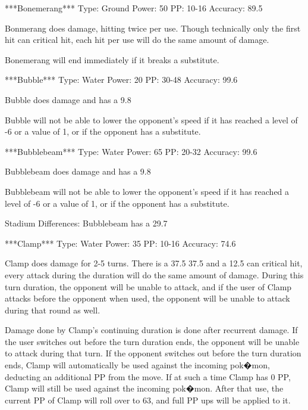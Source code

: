 \documentclass[reprint, aps, prl, paper=A4]{revtex4-1}
\begin{document}
***Bonemerang***
Type: Ground
Power: 50
PP: 10-16
Accuracy: 89.5%

Bonmerang does damage, hitting twice per use. Though technically only the first hit can
critical hit, each hit per use will do the same amount of damage.

Bonemerang will end immediately if it breaks a substitute.


***Bubble***
Type: Water
Power: 20
PP: 30-48
Accuracy: 99.6%

Bubble does damage and has a 9.8%

Bubble will not be able to lower the opponent's speed if it has reached a level of -6 or a
value of 1, or if the opponent has a substitute.


***Bubblebeam***
Type: Water
Power: 65
PP: 20-32
Accuracy: 99.6%

Bubblebeam does damage and has a 9.8%

Bubblebeam will not be able to lower the opponent's speed if it has reached a level of -6 or a
value of 1, or if the opponent has a substitute.

Stadium Differences:
Bubblebeam has a 29.7%


***Clamp***
Type: Water
Power: 35
PP: 10-16
Accuracy: 74.6%

Clamp does damage for 2-5 turns. There is a 37.5%
37.5%
and a 12.5%
can critical hit, every attack during the duration will do the same amount of damage. During
this turn duration, the opponent will be unable to attack, and if the user of Clamp attacks
before the opponent when used, the opponent will be unable to attack during that round as well.

Damage done by Clamp's continuing duration is done after recurrent damage. If the user switches
out before the turn duration ends, the opponent will be unable to attack during that turn. If
the opponent switches out before the turn duration ends, Clamp will automatically be used
against the incoming pok�mon, deducting an additional PP from the move. If at such a time Clamp
has 0 PP, Clamp will still be used against the incoming pok�mon. After that use, the current PP
of Clamp will roll over to 63, and full PP ups will be applied to it.
\end{document}
